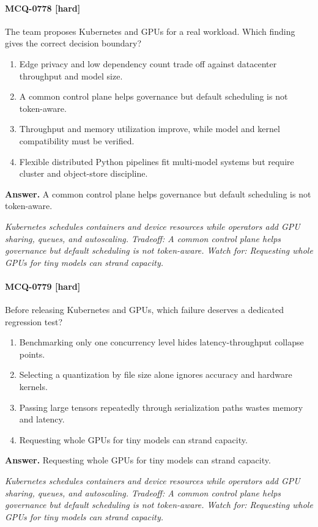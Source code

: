 \paragraph{MCQ-0778 [hard]} The team proposes Kubernetes and GPUs for a real workload. Which finding gives the correct decision boundary?
\begin{enumerate}[label=\Alph*.]
\item Edge privacy and low dependency count trade off against datacenter throughput and model size.
\item A common control plane helps governance but default scheduling is not token-aware.
\item Throughput and memory utilization improve, while model and kernel compatibility must be verified.
\item Flexible distributed Python pipelines fit multi-model systems but require cluster and object-store discipline.
\end{enumerate}
\noindent\textbf{Answer.} A common control plane helps governance but default scheduling is not token-aware.
\par\textit{Kubernetes schedules containers and device resources while operators add GPU sharing, queues, and autoscaling. Tradeoff: A common control plane helps governance but default scheduling is not token-aware. Watch for: Requesting whole GPUs for tiny models can strand capacity.}
\paragraph{MCQ-0779 [hard]} Before releasing Kubernetes and GPUs, which failure deserves a dedicated regression test?
\begin{enumerate}[label=\Alph*.]
\item Benchmarking only one concurrency level hides latency-throughput collapse points.
\item Selecting a quantization by file size alone ignores accuracy and hardware kernels.
\item Passing large tensors repeatedly through serialization paths wastes memory and latency.
\item Requesting whole GPUs for tiny models can strand capacity.
\end{enumerate}
\noindent\textbf{Answer.} Requesting whole GPUs for tiny models can strand capacity.
\par\textit{Kubernetes schedules containers and device resources while operators add GPU sharing, queues, and autoscaling. Tradeoff: A common control plane helps governance but default scheduling is not token-aware. Watch for: Requesting whole GPUs for tiny models can strand capacity.}
